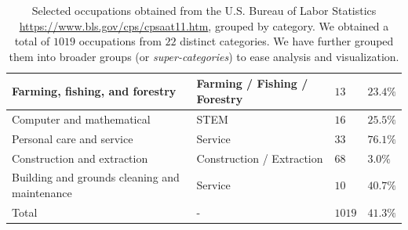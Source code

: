 \documentclass[fleqn,10pt]{article}
\begin{document}
\begin{table}[H]
\begin{small}
\begin{tabular}{|m{3.5cm}|m{2.0cm}|m{2.5cm}|m{2.5cm}|}
	Farming, fishing, and forestry 					& Farming / Fishing / Forestry 	& $13$ 				& $23.4\%$				\\ \hline
	Computer and mathematical						& STEM 							& $16$ 				& $25.5\%$				\\ \hline
	Personal care and service						& Service 						& $33$ 				& $76.1\%$				\\ \hline
	Construction and extraction 					& Construction / Extraction 	& $68$ 				& $3.0\%$ 				\\ \hline
	Building and grounds cleaning and maintenance 	& Service 						& $10$ 				& $40.7\%$				\\ \hline \hline
	Total											& - 							& $1019$			& $41.3\%$				\\ \hline
	\end{tabular}
    \end{small}
	\caption{Selected occupations obtained from the U.S. Bureau of Labor Statistics \url{https://www.bls.gov/cps/cpsaat11.htm}, grouped by category. We obtained a total of $1019$ occupations from $22$ distinct categories. We have further grouped them into broader groups (or \emph{super-categories}) to ease analysis and visualization.}
	\label{tab:occupations}
\end{table}
\end{document}
